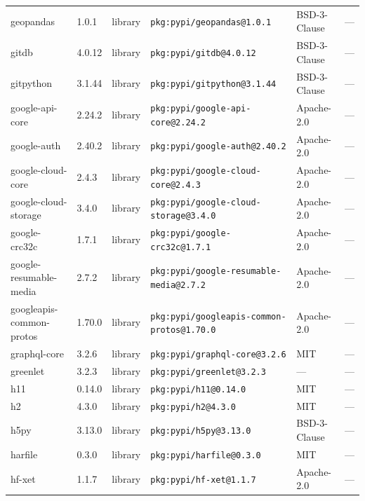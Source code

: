 \documentclass[11pt,a4paper]{article}
\begin{document}
\begin{longtable}{|p{4cm}|p{2cm}|p{1.6cm}|p{5cm}|p{1.5cm}|p{3.5cm}|}
\raggedright geopandas & 1.0.1 & library & \small\texttt{pkg:pypi/geopandas@1.0.1} & BSD-3-Clause & \small — \\
\raggedright gitdb & 4.0.12 & library & \small\texttt{pkg:pypi/gitdb@4.0.12} & BSD-3-Clause & \small — \\
\raggedright gitpython & 3.1.44 & library & \small\texttt{pkg:pypi/gitpython@3.1.44} & BSD-3-Clause & \small — \\
\raggedright google-api-core & 2.24.2 & library & \small\texttt{pkg:pypi/google-api-core@2.24.2} & Apache-2.0 & \small — \\
\raggedright google-auth & 2.40.2 & library & \small\texttt{pkg:pypi/google-auth@2.40.2} & Apache-2.0 & \small — \\
\raggedright google-cloud-core & 2.4.3 & library & \small\texttt{pkg:pypi/google-cloud-core@2.4.3} & Apache-2.0 & \small — \\
\raggedright google-cloud-storage & 3.4.0 & library & \small\texttt{pkg:pypi/google-cloud-storage@3.4.0} & Apache-2.0 & \small — \\
\raggedright google-crc32c & 1.7.1 & library & \small\texttt{pkg:pypi/google-crc32c@1.7.1} & Apache-2.0 & \small — \\
\raggedright google-resumable-media & 2.7.2 & library & \small\texttt{pkg:pypi/google-resumable-media@2.7.2} & Apache-2.0 & \small — \\
\raggedright googleapis-common-protos & 1.70.0 & library & \small\texttt{pkg:pypi/googleapis-common-protos@1.70.0} & Apache-2.0 & \small — \\
\raggedright graphql-core & 3.2.6 & library & \small\texttt{pkg:pypi/graphql-core@3.2.6} & MIT & \small — \\
\raggedright greenlet & 3.2.3 & library & \small\texttt{pkg:pypi/greenlet@3.2.3} & — & \small — \\
\raggedright h11 & 0.14.0 & library & \small\texttt{pkg:pypi/h11@0.14.0} & MIT & \small — \\
\raggedright h2 & 4.3.0 & library & \small\texttt{pkg:pypi/h2@4.3.0} & MIT & \small — \\
\raggedright h5py & 3.13.0 & library & \small\texttt{pkg:pypi/h5py@3.13.0} & BSD-3-Clause & \small — \\
\raggedright harfile & 0.3.0 & library & \small\texttt{pkg:pypi/harfile@0.3.0} & MIT & \small — \\
\raggedright hf-xet & 1.1.7 & library & \small\texttt{pkg:pypi/hf-xet@1.1.7} & Apache-2.0 & \small — \\

\end{longtable}
\end{document}
